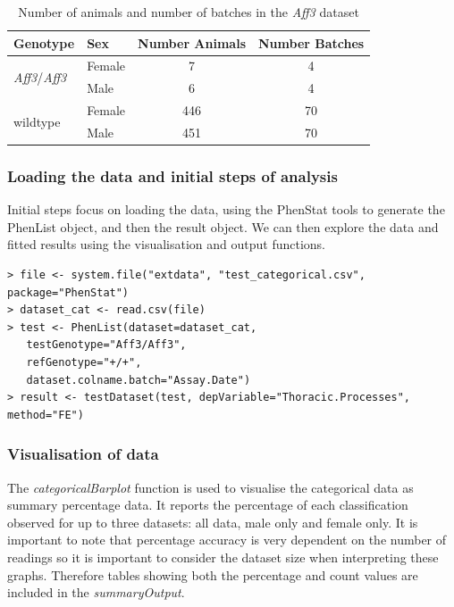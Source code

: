 \documentclass[12pt,a4paper]{article}
\begin{document}
\begin{table}[!h]
\begin{center}
\begin{tabular}{| l | l | c | c |}
  \hline
Genotype&Sex&Number Animals&Number Batches\\\hline
\multirow{2}{*}{\textit{Aff3}\slash \textit{Aff3}}&Female&7&4\\
			    &Male&6&4\\
			    \hline
\multirow{2}{*}{wildtype}&Female&446&70\\
			    &Male&451&70\\

\hline  
\end{tabular}
\caption{Number of animals and number of batches in the \textit{Aff3} dataset}\label{table:09}
\end{center}
\end{table}

\subsubsection{Loading the data and initial steps of analysis}
Initial steps focus on loading the data, using the PhenStat tools to generate the PhenList object, and then the result object.  We can then explore the data and fitted results using the visualisation and output functions.   

\begingroup
    \fontsize{8pt}{12pt}\selectfont
\begin{verbatim}
> file <- system.file("extdata", "test_categorical.csv", package="PhenStat") 
> dataset_cat <- read.csv(file)
> test <- PhenList(dataset=dataset_cat, 
   testGenotype="Aff3/Aff3", 
   refGenotype="+/+", 
   dataset.colname.batch="Assay.Date")
> result <- testDataset(test, depVariable="Thoracic.Processes", method="FE")
\end{verbatim}
\endgroup 

\subsubsection{Visualisation of data}
The \textit{categoricalBarplot} function is used to visualise the categorical data as summary percentage data. 
It reports the percentage of each classification observed for up to three datasets: all data, male only and female only.  
It is important to note that percentage accuracy is very dependent on the number of readings so it is important to consider the dataset size when interpreting these graphs.  
Therefore tables showing both the percentage and count values are included in the \textit{summaryOutput}. 
\end{document}
